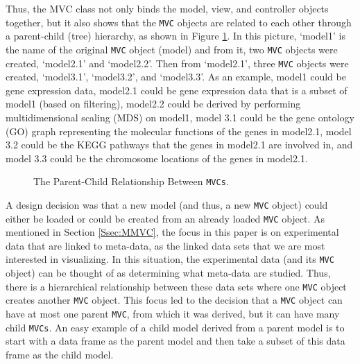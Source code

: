 \documentclass{article}[11pt]
\newcommand{\Robject}[1]{{\texttt{#1}}}
\newcommand{\Rclass}[1]{\textsf{#1}}
\begin{document}
Thus, the \Rclass{MVC} class not only binds the model,
view, and controller objects together, but it also shows
that the \Robject{MVC} objects are related to each other through a
parent-child (tree) hierarchy, as shown in Figure \ref{Fig:Hier}.  In this
picture, `model1' is the name of the original \Robject{MVC} object (model) and
from it, two \Robject{MVC} objects were created, `model2.1' and
`model2.2'. Then from `model2.1', three \Robject{MVC} objects were created,
`model3.1', `model3.2', and `model3.3'.  As an example, model1 could be gene
expression data, model2.1 could be gene expression data that is a subset of
model1 (based on filtering), model2.2 could be derived by performing
multidimensional scaling (MDS) on model1, model 3.1 could be the gene ontology
(GO) graph representing the molecular functions of the genes in model2.1,
model 3.2 could be the KEGG pathways that the genes in model2.1 are involved
in, and model 3.3 could be the chromosome locations of the genes in model2.1.


\begin{figure}[ht]
  \begin{center}
    \caption{ The Parent-Child Relationship Between \Robject{MVCs}. }
    \label{Fig:Hier}
  \end{center}
\end{figure}

A design decision was that a new model (and thus, a new
\Robject{MVC} object) could either be loaded or could be created from an
already loaded \Robject{MVC} object.  As mentioned in Section \ref{Ssec:MMVC},
the focus in this paper is on experimental data that are linked to meta-data,
as the linked data sets that we are most interested in visualizing.  In this
situation, the experimental data (and its \Robject{MVC} object) can be thought
of as determining what meta-data are studied.  Thus, there is a hierarchical
relationship between these data sets where one \Robject{MVC} object creates
another \Robject{MVC} object.  This focus led to the decision that a
\Robject{MVC} object can have at most one parent \Robject{MVC}, from which it
was derived, but it can have many child \Robject{MVCs}.  An easy example of a
child model derived from a parent model is to start with a
data frame as the parent model and then take a subset of this data
frame as the child model. 
\end{document}
